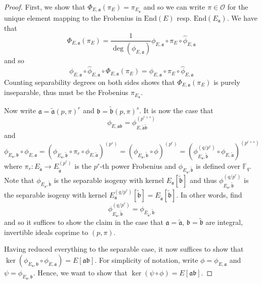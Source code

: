 \documentclass{ociamthesis}
\newcommand{\F}{\mathbb{F}}
\newcommand{\End}{\mathrm{End}}
\renewcommand{\a}{\mathfrak{a}}
\renewcommand{\b}{\mathfrak{b}}
\renewcommand{\O}{\mathcal{O}}
\theoremstyle{definition}
\begin{document}
\begin{proof}
    First, we show that $\Phi_{E, \a}(\pi_E) = \pi_{E_\a}$ and so we can write $\pi \in \O$ for the unique element mapping to the Frobenius in $\End(E)$ resp. $\End(E_\a)$.
    We have that
    \begin{equation*}
        \Phi_{E, \a}(\pi_E) = \frac 1 {\deg(\phi_{E, \a})} \phi_{E, \a} \circ \pi_E \circ \hat{\phi}_{E, \a}
    \end{equation*}
    and so
    \begin{equation*}
        \phi_{E, \a} \circ \hat{\phi}_{E, \a} \circ \Phi_{E, \a}(\pi_E) = \phi_{E, \a} \circ \pi_E \circ \hat{\phi}_{E, \a}
    \end{equation*}
    Counting separability degrees on both sides shows that $\Phi_{E, \a}(\pi_E)$ is purely inseparable, thus must be the Frobenius $\pi_{E_\a}$.
    
    Now write $\a = \tilde{\a} (p, \pi)^r$ and $\b = \tilde{\b} (p, \pi)^s$.
    It is now the case that
    \begin{equation*}
        \phi_{E, \a\b} = \phi_{E, \tilde{\a} \tilde{\b}}^{(p^{r + s})}
    \end{equation*}
    and
    \begin{equation*}
        \phi_{E_\a, \b} \circ \phi_{E, \a} = (\phi_{E_\a, \tilde{\b}} \circ \pi_r \circ \phi_{E, \tilde{\a}})^{(p^s)} = (\phi_{E_\a, \tilde{\b}} \circ \phi)^{(p^r)} = (\phi_{E_\a, \tilde{\b}}^{(q/p^r)} \circ \phi_{E, \tilde{\a}})^{(p^{r + s})}
    \end{equation*}
    where $\pi_r: E_{\tilde{\a}} \to E_{\tilde{\a}}^{(p^r)}$ is the $p^r$-th power Frobenius and $\phi_{E_\a, \tilde{\b}}$ is defined over $\F_q$.
    Note that $\phi_{E_\a, \tilde{\b}}$ is the separable isogeny with kernel $E_\a[\tilde{\b}]$ and thus $\phi_{E_\a, \tilde{\b}}^{(q/p^r)}$ is the separable isogeny with kernel $E_{\a}^{(q/p^r)}[\tilde{\b}] = E_{\tilde{\a}}[\tilde{\b}]$.
    In other words, find
    \begin{equation*}
        \phi_{E_\a, \tilde{\b}}^{(q/p^r)} = \phi_{E_{\tilde{\a}}, \tilde{\b}}
    \end{equation*}
    and so it suffices to show the claim in the case that $\a = \tilde{\a}$, $\b = \tilde{\b}$ are integral, invertible ideals coprime to $(p, \pi)$.

    Having reduced everything to the separable case, it now suffices to show that $\ker(\phi_{E_\a, \b} \circ \phi_{E, \a}) = E[\a\b]$.
    For simplicity of notation, write $\phi = \phi_{E, \a}$ and $\psi = \phi_{E_\a, \b}$.
    Hence, we want to show that $\ker(\psi \circ \phi) = E[\a\b]$.


\end{proof}
\end{document}

